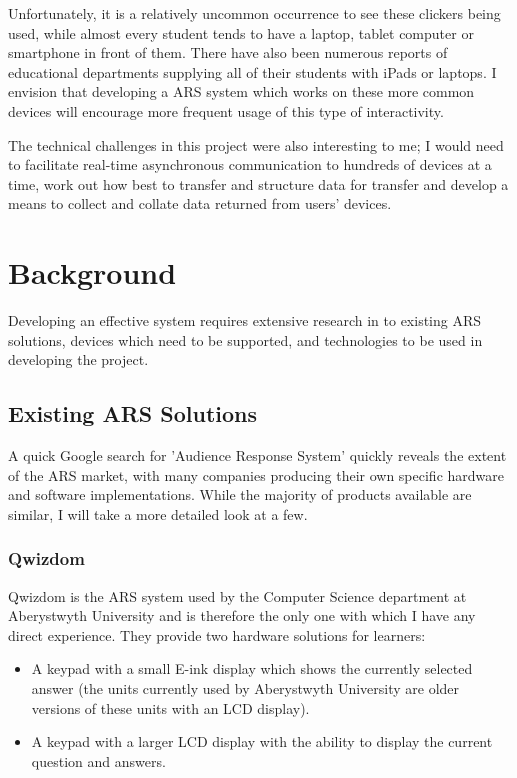 \documentclass[a4papert,11pt,notitlepage]{ltxdoc}
\begin{document}
Unfortunately, it is a relatively uncommon occurrence to see these clickers being used, while almost every student tends to have a laptop, tablet computer or smartphone in front of them. There have also been numerous reports of educational departments supplying all of their students with iPads or laptops. I envision that developing a ARS system which works on these more common devices will encourage more frequent usage of this type of interactivity.

The technical challenges in this project were also interesting to me; I would need to facilitate real-time asynchronous communication to hundreds of devices at a time, work out how best to transfer and structure data for transfer and develop a means to collect and collate data returned from users' devices.

\section{Background}
Developing an effective system requires extensive research in to existing ARS solutions, devices which need to be supported, and technologies to be used in developing the project.

\subsection{Existing ARS Solutions}
A quick Google search for 'Audience Response System' quickly reveals the extent of the ARS market, with many companies producing their own specific hardware and software implementations. While the majority of products available are similar, I will take a more detailed look at a few.

\subsubsection{Qwizdom}
Qwizdom\cite{qwizdom:web} is the ARS system used by the Computer Science department at Aberystwyth University and is therefore the only one with which I have any direct experience. They provide two hardware solutions for learners:
\begin{itemize}
\item A keypad with a small E-ink display which shows the currently selected answer (the units currently used by Aberystwyth University are older versions of these units with an LCD display).
\item A keypad with a larger LCD display with the ability to display the current question and answers.
\end{itemize}
\end{document}
